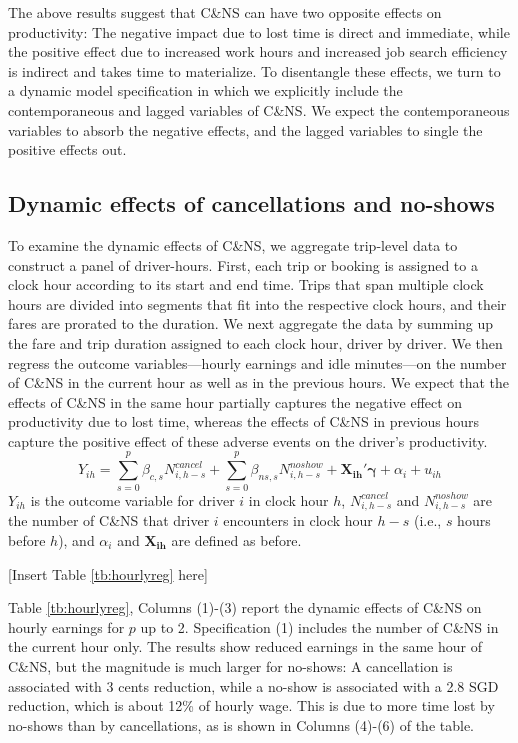 \documentclass[reviewmode]{restud}
\begin{document}
The above results suggest that C\&NS can have two opposite effects on productivity: The negative impact due to lost time is direct and immediate, while the positive effect due to increased work hours and increased job search efficiency is indirect and takes time to materialize. To disentangle these effects, we turn to a dynamic model specification in which we explicitly include the contemporaneous and lagged variables of C\&NS. We expect the contemporaneous variables to absorb the negative effects, and the lagged variables to single the positive effects out.



\subsection{Dynamic effects of cancellations and no-shows}
To examine the dynamic effects of C\&NS, we aggregate trip-level data to construct a panel of driver-hours. First, each trip or booking is assigned to a clock hour according to its start and end time. Trips that span multiple clock hours are divided into segments that fit into the respective clock hours, and their fares are prorated to the duration. We next aggregate the data by summing up the fare and trip duration assigned to each clock hour, driver by driver. We then regress the outcome variables---hourly earnings and idle minutes---on the number of C\&NS in the current hour as well as in the previous hours. We expect that the effects of C\&NS in the same hour partially captures the negative effect on productivity due to lost time, whereas the effects of C\&NS in previous hours capture the positive effect of these adverse events on the driver's productivity.
\begin{equation}
Y_{ih} = \sum_{s=0}^p \beta_{c,s} N^{cancel}_{i,h-s} + \sum_{s=0}^p \beta_{ns,s} N^{noshow}_{i,h-s} +  \mathbf{X_{ih}}'\mathbf{\gamma} + \alpha_i + u_{ih}
\end{equation}
$Y_{ih}$ is the outcome variable for driver $i$ in clock hour $h$, $N^{cancel}_{i, h-s}$ and $N^{noshow}_{i, h-s}$ are the number of C\&NS that driver $i$ encounters in clock hour $h-s$ (i.e., $s$ hours before $h$), and $\alpha_i$ and $\mathbf{X_{ih}}$ are defined as before.

\begin{center}
	[Insert Table \ref{tb:hourlyreg} here]
\end{center}

Table \ref{tb:hourlyreg}, Columns (1)-(3) report the dynamic effects of C\&NS on hourly earnings for $p$ up to 2. Specification (1) includes the number of C\&NS in the current hour only. The results show reduced earnings in the same hour of C\&NS, but the magnitude is much larger for no-shows: A cancellation is associated with 3 cents reduction, while a no-show is associated with a 2.8 SGD reduction, which is about 12\% of hourly wage. This is due to more time lost by no-shows than by cancellations, as is shown in Columns (4)-(6) of the table. 
\end{document}
